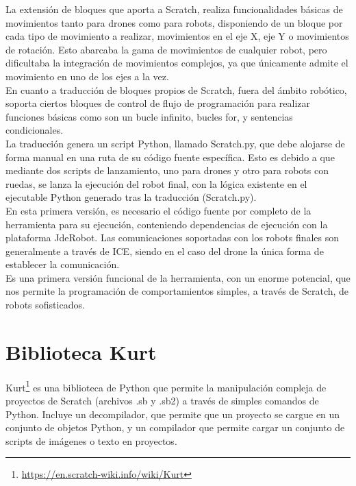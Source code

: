 La extensión de bloques que aporta a Scratch, realiza funcionalidades básicas de movimientos tanto para drones como para robots, disponiendo de un bloque por cada tipo de movimiento a realizar, movimientos en el eje X, eje Y o movimientos de rotación. Esto abarcaba la gama de movimientos de cualquier robot, pero dificultaba la integración de movimientos complejos, ya que únicamente admite el movimiento en uno de los ejes a la vez.\\

En cuanto a traducción de bloques propios de Scratch, fuera del ámbito robótico, soporta ciertos bloques de control de flujo de programación para realizar funciones básicas como son un bucle infinito, bucles for, y sentencias condicionales.\\

La traducción genera un script Python, llamado Scratch.py, que debe alojarse de forma manual en una ruta de su código fuente específica. Esto es debido a que mediante dos scripts de lanzamiento, uno para drones y otro para robots con ruedas, se lanza la ejecución del robot final, con la lógica existente en el ejecutable Python generado tras la traducción (Scratch.py).\\

En esta primera versión, es necesario el código fuente por completo de la herramienta para su ejecución, conteniendo dependencias de ejecución con la plataforma JdeRobot. Las comunicaciones soportadas con los robots finales son generalmente a través de ICE, siendo en el caso del drone la única forma de establecer la comunicación.\\

Es una primera versión funcional de la  herramienta, con un enorme potencial, que nos permite la programación de comportamientos simples, a través de Scratch, de robots sofisticados.

\section{Biblioteca Kurt}
\label{sec:kurt}
Kurt\footnote{\url{https://en.scratch-wiki.info/wiki/Kurt}} es una biblioteca de Python que permite la manipulación compleja de proyectos de Scratch (archivos .sb y .sb2) a través de simples comandos de Python. Incluye un decompilador, que permite que un proyecto se cargue en un conjunto de objetos Python, y un compilador que permite cargar un conjunto de scripts de imágenes o texto en proyectos.\\

